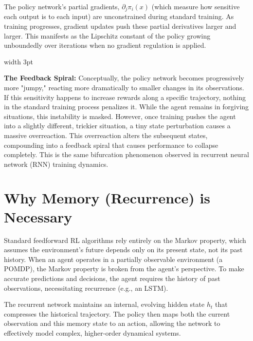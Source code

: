 \documentclass[11pt,a4paper]{article}
\newenvironment{technicalnote}{%
    \medskip
    \noindent
    \color{black!90}%
    \vrule width 3pt \hspace{10pt}%
    \begin{minipage}{\dimexpr\textwidth-15pt}%
    \itshape
}{%
    \end{minipage}%
    \medskip
}
\begin{document}
The policy network's partial gradients, $\partial_{j}\pi_{i}(x)$ (which measure how sensitive each output is to each input) are unconstrained during standard training. As training progresses, gradient updates push these partial derivatives larger and larger. This manifests as the Lipschitz constant of the policy growing unboundedly over iterations when no gradient regulation is applied.

\begin{technicalnote}
\textbf{The Feedback Spiral:} Conceptually, the policy network becomes progressively more "jumpy," reacting more dramatically to smaller changes in its observations. If this sensitivity happens to increase rewards along a specific trajectory, nothing in the standard training process penalizes it. While the agent remains in forgiving situations, this instability is masked. However, once training pushes the agent into a slightly different, trickier situation, a tiny state perturbation causes a massive overreaction. This overreaction alters the subsequent states, compounding into a feedback spiral that causes performance to collapse completely. This is the same bifurcation phenomenon observed in recurrent neural network (RNN) training dynamics.
\end{technicalnote}

\section{Why Memory (Recurrence) is Necessary}
Standard feedforward RL algorithms rely entirely on the Markov property, which assumes the environment's future depends only on its present state, not its past history. When an agent operates in a partially observable environment (a POMDP), the Markov property is broken from the agent's perspective. To make accurate predictions and decisions, the agent requires the history of past observations, necessitating recurrence (e.g., an LSTM).

The recurrent network maintains an internal, evolving hidden state $h_{t}$ that compresses the historical trajectory. The policy then maps both the current observation and this memory state to an action, allowing the network to effectively model complex, higher-order dynamical systems.
\end{document}
